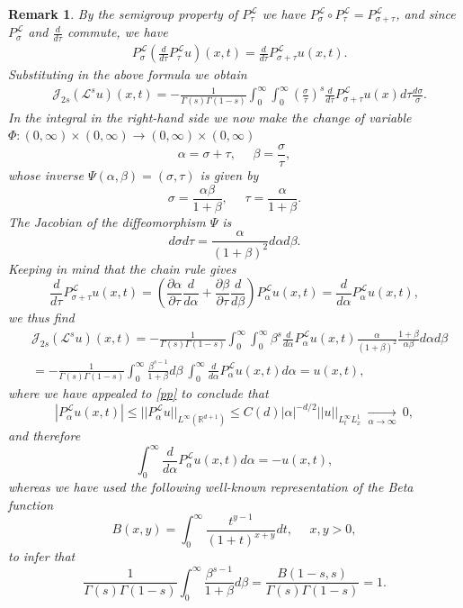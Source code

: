 \documentclass[11pt,letter]{amsart}
\def \R {\mathbb{R}}
\def \G{\Gamma}
\newcommand{\p}{\partial}
\numberwithin{equation}{section}
\newcommand{\Le}{\mathcal L}
\newtheorem{remark}[theorem]{Remark}
\numberwithin{equation}{section}
\begin{document}
\begin{remark}
By the semigroup property of $P^\Le_\tau$ we have $P^\Le_\sigma \circ P^\Le_\tau = P^\Le_{\sigma+\tau}$, and since $P^\Le_\sigma$ and $\frac{d}{d\tau}$ commute, we have
\begin{align*}
& P^\Le_\sigma(\frac{d}{d\tau} P^\Le_\tau u)(x,t) = \frac{d}{d\tau} P^\Le_{\sigma+\tau} u(x,t).
\end{align*}
Substituting in the above formula we obtain
\begin{align}\label{gnam}
& \mathscr J_{2s}(\Le^s u)(x,t) = - \frac{1}{\G(s)\G(1-s)} \int_0^\infty \int_0^\infty \left(\frac \sigma{\tau}\right)^{s} \frac{d}{d\tau} P^\Le_{\sigma+\tau} u(x) d\tau \frac{d\sigma}\sigma.
\end{align}
In the integral in the right-hand side we now make the change of variable $\Phi:(0,\infty)\times(0,\infty)\to (0,\infty)\times(0,\infty)$
\begin{equation}\label{uv}
\alpha = \sigma + \tau,\ \ \ \ \ \ \beta = \frac \sigma{\tau},
\end{equation}
whose inverse $\Psi(\alpha,\beta) = (\sigma,\tau)$ is given by
\begin{equation}\label{ttau}
\sigma = \frac{\alpha\beta}{1+\beta},\ \ \ \ \ \ \tau = \frac{\alpha}{1+\beta}.
\end{equation}
The Jacobian of the diffeomorphism $\Psi$ is 
\[
d\sigma d\tau = \frac{\alpha}{(1+\beta)^2} d\alpha d\beta.
\]  
Keeping in mind that the chain rule gives 
\[
\frac{d}{d\tau} P^\Le_{\sigma+\tau} u(x,t) = \left(\frac{\p \alpha}{\p \tau} \frac{d}{d\alpha} + \frac{\p \beta}{\p\tau} \frac{d}{d\beta}\right) P^\Le_\alpha u(x,t) =  \frac{d}{d\alpha} P^\Le_\alpha u(x,t),
\]
we thus find
\begin{align*}
& \mathscr J_{2s}(\Le^s u)(x,t) = - \frac{1}{\G(s)\G(1-s)} \int_0^\infty \int_0^\infty \beta^{s} \frac{d}{d\alpha} P^\Le_{\alpha} u(x,t) \frac{\alpha}{(1+\beta)^2} \frac{1+\beta}{\alpha\beta} d\alpha d\beta
\\
& = - \frac{1}{\G(s)\G(1-s)} \int_0^\infty  \frac{\beta^{s - 1}}{1+\beta} d\beta\ \int_0^\infty \frac{d}{d\alpha} P^\Le_{\alpha} u(x,t) d\alpha = u(x,t),
\end{align*}
where we have appealed to \eqref{pp} to conclude that
\[
|P^\Le_{\alpha} u(x,t)|\le ||P^\Le_{\alpha} u||_{L^\infty(\R^{d+1})} \le C(d) |\alpha|^{-d/2} ||u||_{L_t^\infty L^1_x}\ \underset{\alpha\to \infty}{\longrightarrow}\ 0,
\]
and therefore
\[
\int_0^\infty \frac{d}{d\alpha} P^\Le_{\alpha} u(x,t) d\alpha = - u(x,t),
\]
whereas we have used the following well-known representation of the Beta function
\[
B(x,y) = \int_0^\infty \frac{t^{y-1}}{(1+t)^{x+y}} dt,\ \ \ \ \ \ x,y>0, 
\]
to infer that
\[
\frac{1}{\G(s)\G(1-s)} \int_0^\infty  \frac{\beta^{s - 1}}{1+\beta} d\beta = \frac{B(1-s,s)}{\G(s)\G(1-s)} = 1.
\]


\end{remark}
\end{document}
